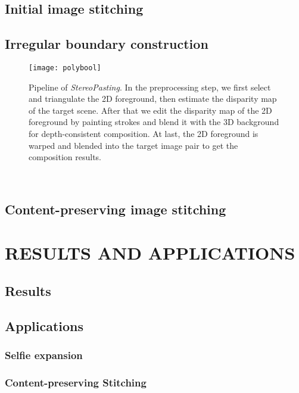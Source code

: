 \documentclass[10pt,journal,compsoc]{IEEEtran}
\begin{document}
 \subsection{Initial image stitching}
 
 

\subsection{Irregular boundary construction}

\begin{figure}[t] %
  \centering
  \texttt{[image: polybool]}

  \caption{Pipeline of \emph{StereoPasting}. In the preprocessing step, we first select and triangulate the 2D foreground, then estimate the disparity map of the target scene. After that we edit the disparity map of the 2D foreground by painting strokes and blend it with the 3D background for depth-consistent composition. At last, the 2D foreground is warped and blended into the target image pair to get the composition results.} \label{fig:polybool}
\end{figure}

~\cite{journals/gandc/MartinezRF09}

\subsection{Content-preserving image stitching} 



 \section{RESULTS AND APPLICATIONS}

 \subsection{Results}

 \subsection{Applications}

 \subsubsection{Selfie expansion}

\subsubsection{Content-preserving Stitching}
\end{document}
